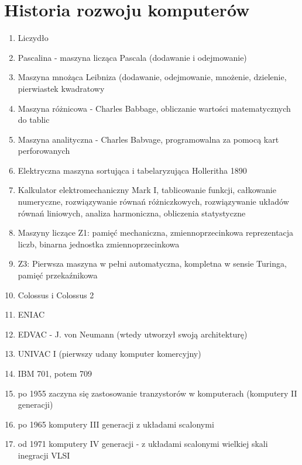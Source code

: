 \documentclass[a4paper,twoside]{article}
\begin{document}
\section*{Historia rozwoju komputerów}
	\begin{enumerate}
    \item Liczydło
    \item Pascalina - maszyna licząca Pascala (dodawanie i odejmowanie)
    \item Maszyna mnożąca Leibniza (dodawanie, odejmowanie, mnożenie, dzielenie, pierwiastek kwadratowy
    \item Maszyna różnicowa - Charles Babbage, obliczanie wartości matematycznych do tablic
    \item Maszyna analityczna - Charles Babvage, programowalna za pomocą kart perforowanych
  	\item Elektryczna maszyna sortująca i tabelaryzująca Holleritha 1890
    \item Kalkulator elektromechaniczny Mark I, tablicowanie funkcji, całkowanie numeryczne, rozwiązywanie równań różniczkowych, rozwiązywanie układów równań liniowych, analiza harmoniczna, obliczenia statystyczne
    \item Maszyny liczące Z1: pamięć mechaniczna, zmiennoprzecinkowa reprezentacja liczb, binarna jednostka zmiennoprzecinkowa
    \item Z3: Pierwsza maszyna w pełni automatyczna, kompletna w sensie Turinga, pamięć przekaźnikowa
    \item Colossus i Colossus 2
    \item ENIAC
    \item EDVAC - J. von Neumann (wtedy utworzył swoją architekturę) \\
    	\begin{figure}[h]
		\centering
		\end{figure}
    \item UNIVAC I (pierwszy udany komputer komercyjny)
    \item IBM 701, potem 709
    \item po 1955 zaczyna się zastosowanie tranzystorów w komputerach (komputery II generacji)
    \item po 1965 komputery III generacji z układami scalonymi
    \item od 1971 komputery IV generacji - z układami scalonymi wielkiej skali inegracji VLSI
    \end{enumerate}
    
\end{document}
